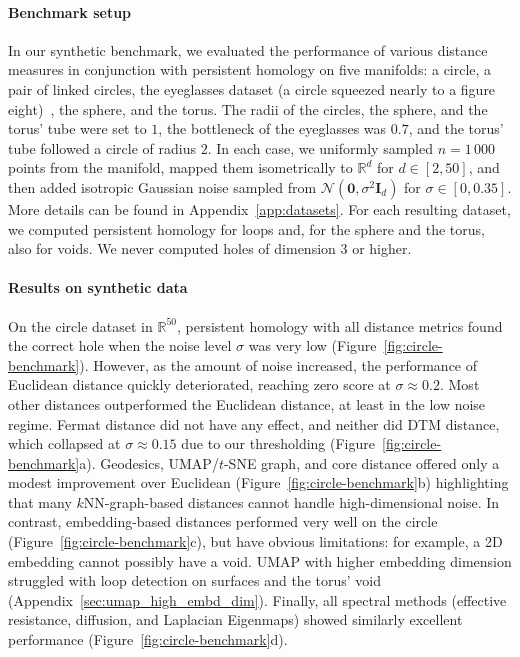 \documentclass{article}
\theoremstyle{plain}
\theoremstyle{definition}
\theoremstyle{remark}
\begin{document}
\paragraph{Benchmark setup}
\label{subsec:benchmark_setup}

In our synthetic benchmark, we evaluated the performance of various distance measures in conjunction with persistent homology on five manifolds: a circle, a pair of linked circles, the eyeglasses dataset (a circle squeezed nearly to a figure eight)~\citep{fernandez2023intrinsic}, the sphere, and the torus. The radii of the circles, the sphere, and the torus' tube were set to $1$, the bottleneck of the eyeglasses was $0.7$, and the torus' tube followed a circle of radius $2$. In each case, we uniformly sampled $n=1\,000$ points from the manifold, mapped them isometrically to $\mathbb{R}^d$ for $d\in[2, 50]$, and then added isotropic Gaussian noise sampled from $\mathcal{N}(\mathbf 0, \sigma^2 \mathbf I_d)$ for $\sigma \in [0, 0.35]$. More details can be found in Appendix~\ref{app:datasets}. For each resulting dataset, we computed persistent homology for loops and, for the sphere and the torus, also for voids. We never computed holes of dimension $3$ or higher.


\paragraph{Results on synthetic data}

On the circle dataset in $\mathbb R^{50}$, persistent homology with all distance metrics found the correct hole when the noise level $\sigma$ was very low (Figure~\ref{fig:circle-benchmark}). However, as the amount of noise increased, the performance of Euclidean distance quickly deteriorated, reaching zero score at $\sigma\approx0.2$. Most other distances outperformed the Euclidean distance, at least in the low noise regime. Fermat distance did not have any effect, and neither did DTM distance, which collapsed at $\sigma\approx0.15$ due to our thresholding (Figure~\ref{fig:circle-benchmark}a). Geodesics, UMAP/$t$-SNE graph, and core distance offered only a modest improvement over Euclidean (Figure~\ref{fig:circle-benchmark}b) highlighting that many $k$NN-graph-based distances cannot handle high-dimensional noise. In contrast, embedding-based distances performed very well on the circle (Figure~\ref{fig:circle-benchmark}c), but have obvious limitations: for example, a 2D embedding cannot possibly have a void. UMAP with higher embedding dimension struggled with loop detection on surfaces and the torus' void (Appendix~\ref{sec:umap_high_embd_dim}). Finally, all spectral methods (effective resistance, diffusion, and Laplacian Eigenmaps) showed similarly excellent performance (Figure~\ref{fig:circle-benchmark}d).
\end{document}
